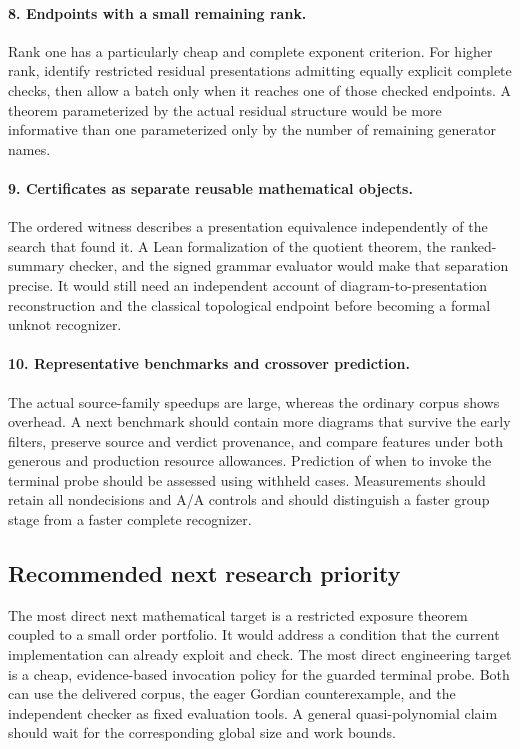 \paragraph{8. Endpoints with a small remaining rank.}
Rank one has a particularly cheap and complete exponent criterion.
For higher rank, identify restricted residual presentations admitting
equally explicit complete checks, then allow a batch only when it reaches
one of those checked endpoints. A theorem parameterized by the actual
residual structure would be more informative than one parameterized only
by the number of remaining generator names.

\paragraph{9. Certificates as separate reusable mathematical objects.}
The ordered witness describes a presentation equivalence independently of
the search that found it. A Lean formalization of the quotient theorem,
the ranked-summary checker, and the signed grammar evaluator would make
that separation precise. It would still need an independent account of
diagram-to-presentation reconstruction and the classical topological
endpoint before becoming a formal unknot recognizer.

\paragraph{10. Representative benchmarks and crossover prediction.}
The actual source-family speedups are large, whereas the ordinary corpus
shows overhead. A next benchmark should contain more diagrams that survive
the early filters, preserve source and verdict provenance, and compare
features under both generous and production resource allowances. Prediction
of when to invoke the terminal probe should be assessed using withheld
cases. Measurements should retain all nondecisions and A/A controls and
should distinguish a faster group stage from a faster complete recognizer.

\subsection{Recommended next research priority}

The most direct next mathematical target is a restricted exposure theorem
coupled to a small order portfolio. It would address a condition that the
current implementation can already exploit and check. The most direct
engineering target is a cheap, evidence-based invocation policy for the
guarded terminal probe. Both can use the delivered corpus, the eager
Gordian counterexample, and the independent checker as fixed evaluation
tools. A general quasi-polynomial claim should wait for the corresponding
global size and work bounds.
